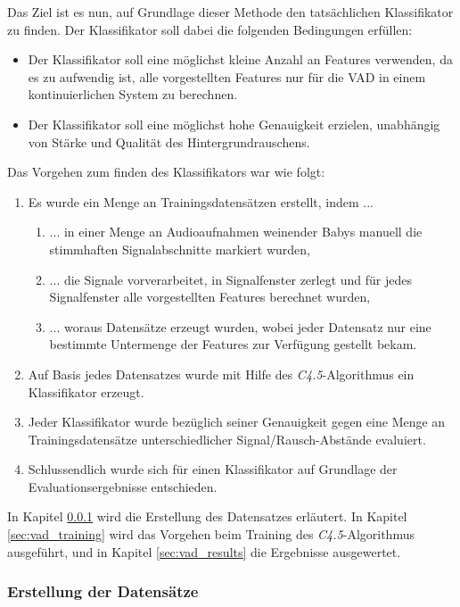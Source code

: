 Das Ziel ist es nun, auf Grundlage dieser Methode den tatsächlichen Klassifikator zu finden. Der Klassifikator soll dabei die folgenden Bedingungen erfüllen:

\begin{itemize}
\item Der Klassifikator soll eine möglichst kleine Anzahl an Features verwenden, da es zu aufwendig ist, alle vorgestellten Features nur für die VAD in einem kontinuierlichen System zu berechnen.
\item Der Klassifikator soll eine möglichst hohe Genauigkeit erzielen, unabhängig von Stärke und Qualität des Hintergrundrauschens.
\end{itemize}

Das Vorgehen zum finden des Klassifikators war wie folgt:
\begin{enumerate}
\item Es wurde ein Menge an Trainingsdatensätzen erstellt, indem ...
	\begin{enumerate}[label*=\arabic*.]
	\item ... in einer Menge an Audioaufnahmen weinender Babys manuell die stimmhaften Signalabschnitte markiert wurden,
	\item ... die Signale vorverarbeitet, in Signalfenster zerlegt und für jedes Signalfenster alle vorgestellten Features berechnet wurden,
	\item ... woraus Datensätze erzeugt wurden, wobei jeder Datensatz nur eine bestimmte Untermenge der Features zur Verfügung gestellt bekam.
	\end{enumerate}
\item Auf Basis jedes Datensatzes wurde mit Hilfe des \emph{C4.5}-Algorithmus ein Klassifikator erzeugt.
\item Jeder Klassifikator wurde bezüglich seiner Genauigkeit gegen eine Menge an Trainingsdatensätze unterschiedlicher Signal/Rausch-Abstände evaluiert.
\item Schlussendlich wurde sich für einen Klassifikator auf Grundlage der Evaluationsergebnisse entschieden.
\end{enumerate}

In Kapitel \ref{sec:vad_database} wird die Erstellung des Datensatzes erläutert. In Kapitel \ref{sec:vad_training} wird das Vorgehen beim Training des \emph{C4.5}-Algorithmus ausgeführt, und in Kapitel \ref{sec:vad_results} die Ergebnisse ausgewertet.

\subsubsection{Erstellung der Datensätze}
\label{sec:vad_database}

